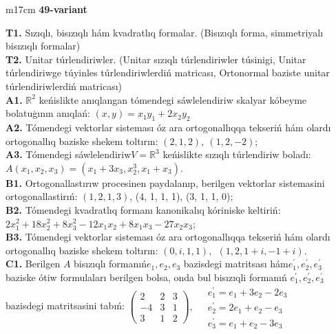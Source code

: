 \documentclass{article}
\begin{document}
\begin{tabular}{m{17cm}}
\textbf{49-variant}
\newline

\textbf{T1.} Sızıqlı, bisızıqlı hám kvadratlıq formalar. (Bisızıqlı forma,  simmetriyalı bisızıqlı formalar)  \\
\textbf{T2.} Unitar túrlendiriwler. (Unitar sızıqlı túrlendiriwler túsinigi,  Unitar túrlendiriwge túyinles túrlendiriwlerdiń matricası,   Ortonormal baziste unitar túrlendiriwlerdiń matricası) \\
\textbf{A1.} \(\mathbb{R}^{2}\) keńislikte anıqlangan tómendegi sáwlelendiriw skalyar kóbeyme bolatuģının anıqlań: \((x,y) = x_{1}y_{1} + 2x_{2}y_{2}\) \\
\textbf{A2.} Tómendegi vektorlar sisteması óz ara ortogonallıqqa tekseriń hám olardı ortogonallıq baziske shekem toltırın: \((2,1,2),\ (1,2, - 2)\); \\
\textbf{A3.} Tómendegi sáwlelendiriw\(V = \mathbb{R}^{3}\) keńislikte sızıqlı túrlendiriw boladı: \(A\left( x_{1},x_{2},x_{3} \right) = \left( x_{1} + 3x_{3},x_{2}^{3},x_{1} + x_{3} \right)\). \\
\textbf{B1.} Ortogonallastırıw procesinen paydalanıp, berilgen vektorlar sistemasini ortogonallastirıń: \((1,2,1,3)\), (4, 1, 1, 1), (3, 1, 1, 0); \\
\textbf{B2.} Tómendegi kvadratlıq formanı kanonikalıq kóriniske keltiriń: \(2x_{1}^{2} + 18x_{2}^{2} + 8x_{3}^{2} - 12x_{1}x_{2} + 8x_{1}x_{3} - 27x_{2}x_{3}\); \\
\textbf{B3.} Tómendegi vektorlar sisteması óz ara ortogonallıqqa tekseriń hám olardı ortogonallıq baziske shekem toltırın: \((0,i,1,1),\ \ (1,2,1 + i, - 1 + i)\). \\
\textbf{C1.} Berilgen \(A\) bisızıqlı formanıń\(e_{1},e_{2},e_{3}\) bazisdegi matritsası hám\(e_{1}^{'},e_{2}^{'},e_{3}^{'}\) baziske ótiw formulaları berilgen bolsa, onda bul bisızıqli formanıń \(e_{1}^{'},e_{2}^{'},e_{3}^{'}\) bazisdegi matritsasini tabıń: \(\begin{pmatrix} 2 & 2 & 3 \\  - 4 & 3 & 1 \\ 3 & 1 & 2 \end{pmatrix},\ \begin{matrix}  & e_{1}^{'} = e_{1} + 3e_{2} - 2e_{3} \\  & e_{2}^{'} = 2e_{1} + e_{2} - e_{3} \\  & e_{3}^{'} = e_{1} + e_{2} - 3e_{3} \end{matrix}\) \\

\end{tabular}
\end{document}
